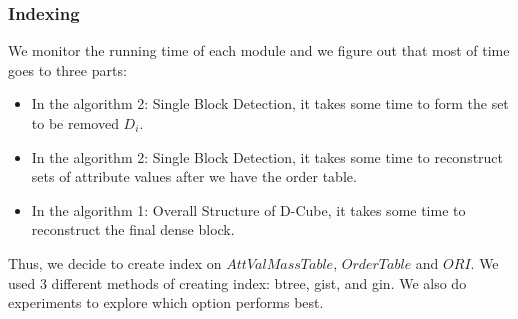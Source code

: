 \subsubsection{Indexing}
We monitor the running time of each module and we figure out that most of time goes to three parts: 
\begin{itemize}
    \item In the algorithm 2: Single Block Detection, it takes some time to form the set to be removed $D_i$.
    \item In the algorithm 2: Single Block Detection, it takes some time to reconstruct sets of attribute values after we have the order table.
    \item In the algorithm 1: Overall Structure of D-Cube, it takes some time to reconstruct the final dense block.
\end{itemize}
Thus, we decide to create index on $AttValMassTable$, $OrderTable$ and $ORI$. We used 3 different methods of creating index: btree, gist, and gin. We also do experiments to explore which option performs best.\\
